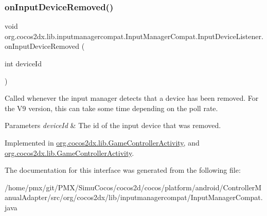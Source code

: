 \subsubsection{\texorpdfstring{on\+Input\+Device\+Removed()}{onInputDeviceRemoved()}\hspace{0.1cm}{\footnotesize\ttfamily [2/2]}}
{\footnotesize\ttfamily void org.\+cocos2dx.\+lib.\+inputmanagercompat.\+Input\+Manager\+Compat.\+Input\+Device\+Listener.\+on\+Input\+Device\+Removed (\begin{DoxyParamCaption}\item[{int}]{device\+Id }\end{DoxyParamCaption})}

Called whenever the input manager detects that a device has been removed. For the V9 version, this can take some time depending on the poll rate.


\begin{DoxyParams}{Parameters}
{\em device\+Id} & The id of the input device that was removed. \\
\hline
\end{DoxyParams}


Implemented in \hyperlink{classorg_1_1cocos2dx_1_1lib_1_1GameControllerActivity_aec412cd3d3092fa8d9c0a90567062111}{org.\+cocos2dx.\+lib.\+Game\+Controller\+Activity}, and \hyperlink{classorg_1_1cocos2dx_1_1lib_1_1GameControllerActivity_aec412cd3d3092fa8d9c0a90567062111}{org.\+cocos2dx.\+lib.\+Game\+Controller\+Activity}.



The documentation for this interface was generated from the following file\+:\begin{DoxyCompactItemize}
\item 
/home/pmx/git/\+P\+M\+X/\+Simu\+Cocos/cocos2d/cocos/platform/android/\+Controller\+Manual\+Adapter/src/org/cocos2dx/lib/inputmanagercompat/Input\+Manager\+Compat.\+java\end{DoxyCompactItemize}
